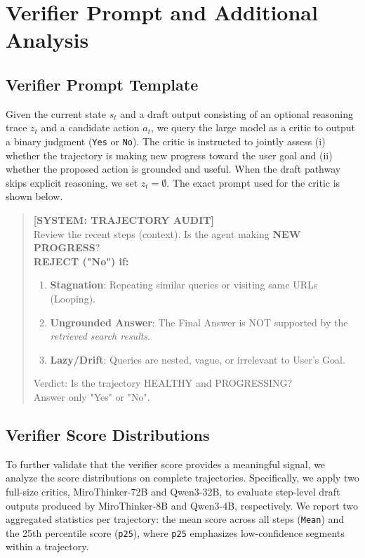 \newpage
\appendix
\onecolumn

\section{Verifier Prompt and Additional Analysis}
\label{app:verifier}

\subsection{Verifier Prompt Template}
\label{app:verifier_prompt}

Given the current state $s_t$ and a draft output consisting of an optional reasoning trace $z_t$ and a candidate action $a_t$, we query the large model as a critic to output a binary judgment (\texttt{Yes} or \texttt{No}).
The critic is instructed to jointly assess (i) whether the trajectory is making new progress toward the user goal and (ii) whether the proposed action is grounded and useful.
When the draft pathway skips explicit reasoning, we set $z_t=\emptyset$.
The exact prompt used for the critic is shown below.

\begin{quote}
\small
\noindent\textbf{[SYSTEM: TRAJECTORY AUDIT]}\\
Review the recent steps (context). Is the agent making \textbf{NEW PROGRESS}?\\[0.3em]
\noindent\textbf{REJECT ("No") if:}
\begin{enumerate}
    \item \textbf{Stagnation}: Repeating similar queries or visiting same URLs (Looping).
    \item \textbf{Ungrounded Answer}: The Final Answer is NOT supported by the \textit{retrieved search results}.
    \item \textbf{Lazy/Drift}: Queries are nested, vague, or irrelevant to User's Goal.
\end{enumerate}
\noindent Verdict: Is the trajectory HEALTHY and PROGRESSING?\\
Answer only "Yes" or "No".
\end{quote}

\subsection{Verifier Score Distributions}
\label{app:verifier_scores}

To further validate that the verifier score provides a meaningful signal, we analyze the score distributions on complete trajectories.
Specifically, we apply two full-size critics, MiroThinker-72B and Qwen3-32B, to evaluate step-level draft outputs produced by MiroThinker-8B and Qwen3-4B, respectively.
We report two aggregated statistics per trajectory: the mean score across all steps (\texttt{Mean}) and the 25th percentile score (\texttt{p25}), where \texttt{p25} emphasizes low-confidence segments within a trajectory.

